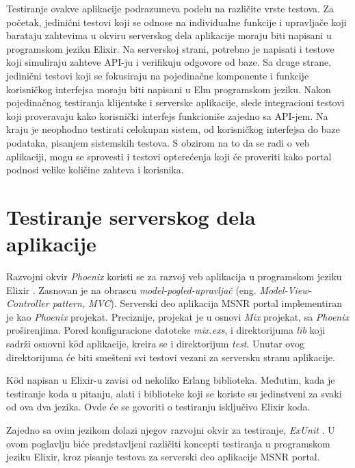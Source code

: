 \documentclass[12pt,oneside]{memoir}
\begin{document}
\par Testiranje ovakve aplikacije podrazumeva podelu na različite vrste testova. Za početak, jedinični testovi koji se odnose na individualne funkcije i upravljače koji barataju zahtevima u okviru serverskog dela aplikacije moraju biti napisani u programskom jeziku Elixir. Na serverskoj strani, potrebno je napisati i testove koji simuliraju zahteve API-ju i verifikuju odgovore od baze. Sa druge strane, jedinični testovi koji se fokusiraju na pojedinačne komponente i funkcije korisničkog interfejsa moraju biti napisani u Elm programskom jeziku. Nakon pojedinačnog testiranja klijentske i serverske aplikacije, slede integracioni testovi koji proveravaju kako korisnički interfejs funkcioniše zajedno sa API-jem. Na kraju je neophodno testirati celokupan sistem, od korisničkog interfejsa do baze podataka, pisanjem sistemskih testova. S obzirom na to da se radi o veb aplikaciji, mogu se sprovesti i testovi opterećenja koji će proveriti kako portal podnosi velike količine zahteva i korisnika.

\chapter{Testiranje serverskog dela aplikacije}
\label{chp:elixir}

\par Razvojni okvir \emph{Phoenix} koristi se za razvoj veb aplikacija u programskom jeziku Elixir \cite{phx}. Zasnovan je na obrascu \emph{model-pogled-upravljač} (eng. \emph{Model-View-Controller pattern, MVC}). Serverski deo aplikacija MSNR portal implementiran je kao \emph{Phoenix} projekat. Preciznije, projekat je u osnovi \emph{Mix} projekat, sa \emph{Phoenix} proširenjima. Pored konfiguracione datoteke \emph{mix.exs}, i direktorijuma \emph{lib} koji sadrži osnovni k$\hat{o}$d aplikacije, kreira se i direktorijum \emph{test}. Unutar ovog direktorijuma će biti smešteni svi testovi vezani za serversku stranu aplikacije. 
\par K$\hat{o}$d napisan u Elixir-u zavisi od nekoliko Erlang biblioteka. Međutim, kada je testiranje koda u pitanju, alati i biblioteke koji se koriste su jedinstveni za svaki od ova dva jezika. Ovde će se govoriti o testiranju isključivo Elixir koda. 
\par Zajedno sa ovim jezikom dolazi njegov razvojni okvir za testiranje, \emph{ExUnit} \cite{exunit}. U ovom poglavlju biće predstavljeni različiti koncepti testiranja u programskom jeziku Elixir, kroz pisanje testova za serverski deo aplikacije MSNR portal. 
\end{document}
